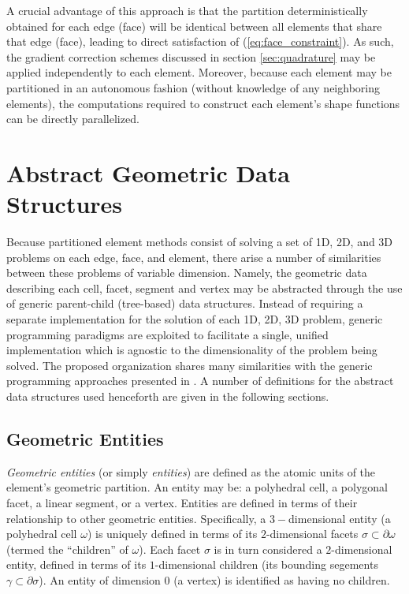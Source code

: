 	A crucial advantage of this approach is that the partition deterministically obtained for each edge (face) will be identical between all elements that share that edge (face), leading to direct satisfaction of (\ref{eq:face_constraint}). As such, the gradient correction schemes discussed in section \ref{sec:quadrature} may be applied independently to each element. Moreover, because each element may be partitioned in an autonomous fashion (without knowledge of any neighboring elements), the computations required to construct each element's shape functions can be directly parallelized.

\section{Abstract Geometric Data Structures}

	Because partitioned element methods consist of solving a set of 1D, 2D, and 3D problems on each edge, face, and element, there arise a number of similarities between these problems of variable dimension. Namely, the geometric data describing each cell, facet, segment and vertex may be abstracted through the use of generic parent-child (tree-based) data structures. Instead of requiring a separate implementation for the solution of each 1D, 2D, 3D problem, generic programming paradigms are exploited to facilitate a single, unified implementation which is agnostic to the dimensionality of the problem being solved. The proposed organization shares many similarities with the generic programming approaches presented in \cite{Cicuttin:17}. A number of definitions for the abstract data structures used henceforth are given in the following sections.
	
\subsection*{Geometric Entities}

	\textit{Geometric entities} (or simply \textit{entities}) are defined as the atomic units of the element's geometric partition. An entity may be: a polyhedral cell, a polygonal facet, a linear segment, or a vertex. Entities are defined in terms of their relationship to other geometric entities. Specifically, a $3-$dimensional entity (a polyhedral cell $\omega$) is uniquely defined in terms of its $2$-dimensional facets $\sigma \subset \partial \omega$ (termed the ``children'' of $\omega$). Each facet $\sigma$ is in turn considered a $2$-dimensional entity, defined in terms of its $1$-dimensional children (its bounding segements $\gamma \subset \partial \sigma$). An entity of dimension $0$ (a vertex) is identified as having no children.
	
